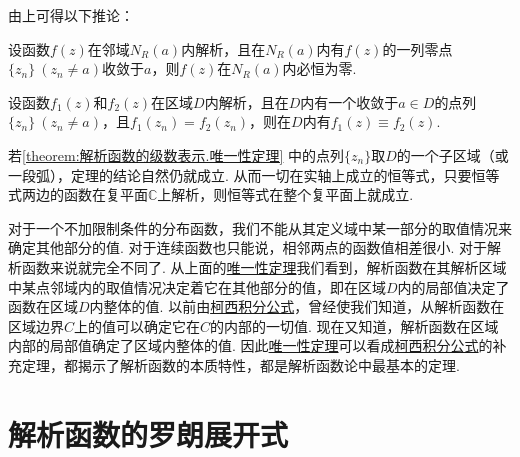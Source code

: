 由上可得以下推论：
\begin{corollary}
设函数\(f(z)\)在邻域\(N_R(a)\)内解析，且在\(N_R(a)\)内有\(f(z)\)的一列零点\(\{z_n\}\ (z_n \neq a)\)收敛于\(a\)，则\(f(z)\)在\(N_R(a)\)内必恒为零.
\end{corollary}

\begin{theorem}[唯一性定理]\label{theorem:解析函数的级数表示.唯一性定理}
设函数\(f_1(z)\)和\(f_2(z)\)在区域\(D\)内解析，且在\(D\)内有一个收敛于\(a \in D\)的点列\(\{z_n\}\ (z_n \neq a)\)，且\(f_1(z_n) = f_2(z_n)\)，则在\(D\)内有\(f_1(z) \equiv f_2(z)\).
\end{theorem}

若\cref{theorem:解析函数的级数表示.唯一性定理} 中的点列\(\{z_n\}\)取\(D\)的一个子区域（或一段弧），定理的结论自然仍就成立.
从而一切在实轴上成立的恒等式，只要恒等式两边的函数在复平面\(\mathbb{C}\)上解析，则恒等式在整个复平面上就成立.

对于一个不加限制条件的分布函数，我们不能从其定义域中某一部分的取值情况来确定其他部分的值.
对于连续函数也只能说，相邻两点的函数值相差很小.
对于解析函数来说就完全不同了.
从上面的\hyperref[theorem:解析函数的级数表示.唯一性定理]{唯一性定理}我们看到，解析函数在其解析区域中某点邻域内的取值情况决定着它在其他部分的值，即在区域\(D\)内的局部值决定了函数在区域\(D\)内整体的值.
以前由\hyperref[equation:解析函数的积分表示.柯西积分公式]{柯西积分公式}，曾经使我们知道，从解析函数在区域边界\(C\)上的值可以确定它在\(C\)的内部的一切值.
现在又知道，解析函数在区域内部的局部值确定了区域内整体的值.
因此\hyperref[theorem:解析函数的级数表示.唯一性定理]{唯一性定理}可以看成\hyperref[equation:解析函数的积分表示.柯西积分公式]{柯西积分公式}的补充定理，都揭示了解析函数的本质特性，都是解析函数论中最基本的定理.

\section{解析函数的罗朗展开式}


